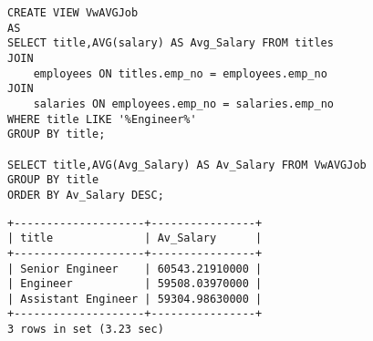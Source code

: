 \documentclass[]{article}
\begin{document}
\begin{enumerate}
\begin{verbatim}
CREATE VIEW VwAVGJob
AS
SELECT title,AVG(salary) AS Avg_Salary FROM titles
JOIN 
	employees ON titles.emp_no = employees.emp_no
JOIN
	salaries ON employees.emp_no = salaries.emp_no
WHERE title LIKE '%Engineer%'
GROUP BY title;

SELECT title,AVG(Avg_Salary) AS Av_Salary FROM VwAVGJob
GROUP BY title
ORDER BY Av_Salary DESC;
\end{verbatim}

\begin{verbatim}
+--------------------+----------------+
| title              | Av_Salary      |
+--------------------+----------------+
| Senior Engineer    | 60543.21910000 |
| Engineer           | 59508.03970000 |
| Assistant Engineer | 59304.98630000 |
+--------------------+----------------+
3 rows in set (3.23 sec)
\end{verbatim}

\end{enumerate}
\end{document}
